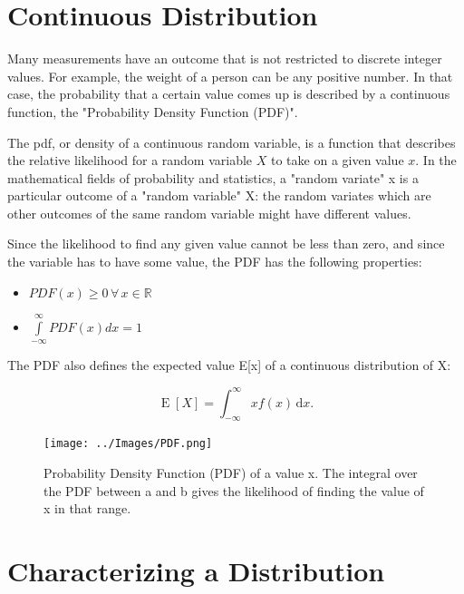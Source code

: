 \section{Continuous Distribution}

Many measurements have an outcome that is not restricted to discrete integer values. For example, the weight of a person can be any positive number. In that case, the probability that a certain value comes up is described by a continuous function, the "Probability Density Function (PDF)".

The \acrfull{pdf}, or \gls{density} of a continuous random variable, is a function that describes the relative likelihood for a random variable $X$ to take on a given value $x$.
In the mathematical fields of probability and statistics, a "random variate" x  is a particular outcome of a "random variable" X: the random variates which are other outcomes of the same random variable might have different values.

Since the likelihood to find any given value cannot be less than zero, and since the variable has to have some value, the PDF has the following properties:

\begin{itemize}
  \item $PDF(x) \geq 0\,\forall \,x \in \mathbb{R}$
  \item $ \int\limits_{ - \infty }^\infty  {PDF(x)dx = 1} $
\end{itemize}

The PDF also defines the expected value E[x]  of a continuous distribution of X:

\begin{equation}\label{eq:expectedValue}
   \operatorname{E}[X] = \int_{-\infty}^\infty x f(x)\, \mathrm{d}x .
\end{equation}

\begin{figure}
  \centering
  \texttt{[image: ../Images/PDF.png]}\\
  \caption{Probability Density Function (PDF) of a value x. The integral over the PDF between a and b gives the likelihood of finding the value of x in that range.}
  \label{fig:PDF}
\end{figure}

\section{Characterizing a Distribution}

